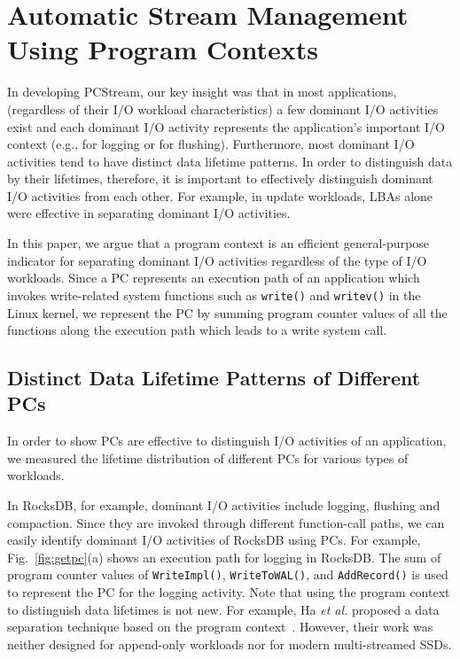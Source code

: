 \section{Automatic Stream Management Using Program Contexts}

In developing \textsf{\small PCStream}, our key insight was that in most applications,
(regardless of their I/O workload characteristics)
a few dominant I/O activities exist
and each dominant I/O activity   
represents the application's important I/O context (e.g., for logging or for flushing). 
Furthermore, most dominant I/O activities tend to have distinct data lifetime patterns.
In order to distinguish data by their lifetimes, therefore, 
it is important to effectively distinguish dominant I/O activities from each other.  
For example, in update workloads, 
LBAs alone were effective in separating dominant I/O activities.  

In this paper, we argue that a program context is an efficient general-purpose
indicator for separating dominant I/O activities regardless of the type of I/O
workloads.  Since a PC represents an execution path of an application which
invokes write-related system functions such as {\tt write()} and {\tt writev()}
in the Linux kernel,  we represent the PC by summing program counter values of
all the functions along the execution path which leads to a write system call.

\subsection{Distinct Data Lifetime Patterns of Different PCs}
In order to show PCs are effective to distinguish I/O activities of
an application, we measured the lifetime distribution of different PCs for various
types of workloads.

In RocksDB, for example, dominant I/O activities include logging, flushing and
compaction.  Since they are invoked through different function-call paths, we
can easily identify dominant I/O activities of RocksDB using PCs.  For example,
Fig.~\ref{fig:getpc}(a) shows an execution path for logging in RocksDB.  The
sum of program counter values of \texttt{WriteImpl()}, \texttt{WriteToWAL()},
and \texttt{AddRecord()} is used to represent the PC for the logging
activity. Note that using the program context to distinguish data lifetimes is
not new. For example, Ha {\it et al.} proposed a data separation technique
based on the program context~\cite{PCHa}.  However, their work was neither
designed for append-only workloads nor for modern multi-streamed SSDs.

